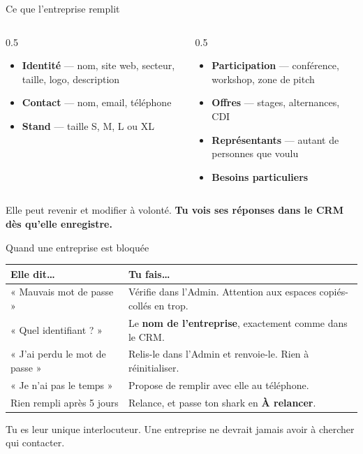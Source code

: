\documentclass[aspectratio=169,11pt]{beamer}
\newcommand{\cle}[1]{\textbf{\textcolor{noirApp}{#1}}}
\begin{document}
\begin{frame}{Ce que l'entreprise remplit}
  \begin{columns}[T]
    \begin{column}{0.5\textwidth}
      \begin{itemize}
        \item \cle{Identité} --- nom, site web, secteur, taille, logo,
              description
        \item \cle{Contact} --- nom, email, téléphone
        \item \cle{Stand} --- taille S, M, L ou XL
      \end{itemize}
    \end{column}
    \begin{column}{0.5\textwidth}
      \begin{itemize}
        \item \cle{Participation} --- conférence, workshop, zone de pitch
        \item \cle{Offres} --- stages, alternances, CDI
        \item \cle{Représentants} --- autant de personnes que voulu
        \item \cle{Besoins particuliers}
      \end{itemize}
    \end{column}
  \end{columns}

  \vfill
  \begin{block}{}
    Elle peut revenir et modifier à volonté.
    \textbf{Tu vois ses réponses dans le CRM dès qu'elle enregistre.}
  \end{block}
\end{frame}

\begin{frame}{Quand une entreprise est bloquée}
  \small
  \renewcommand{\arraystretch}{1.35}
  \begin{tabularx}{\textwidth}{@{}>{\raggedright\arraybackslash}p{} >{\raggedright\arraybackslash}X@{}}
    \toprule
    \textbf{Elle dit\ldots} & \textbf{Tu fais\ldots} \\
    \midrule
    « Mauvais mot de passe »
      & Vérifie dans l'Admin. Attention aux espaces copiés-collés en trop. \\
    « Quel identifiant ? »
      & Le \textbf{nom de l'entreprise}, exactement comme dans le CRM. \\
    « J'ai perdu le mot de passe »
      & Relis-le dans l'Admin et renvoie-le. Rien à réinitialiser. \\
    « Je n'ai pas le temps »
      & Propose de remplir avec elle au téléphone. \\
    Rien rempli après 5 jours
      & Relance, et passe ton shark en \textbf{À relancer}. \\
    \bottomrule
  \end{tabularx}

  \vfill
  \centering
  Tu es leur unique interlocuteur. Une entreprise ne devrait jamais avoir à
  chercher qui contacter.
\end{frame}
\end{document}
